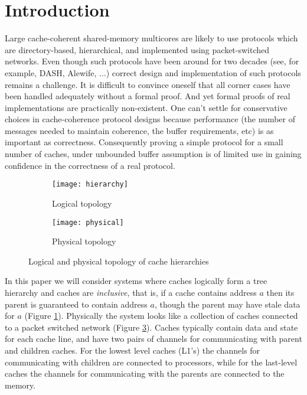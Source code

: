 \section{Introduction} 

Large cache-coherent shared-memory multicores are likely to use protocols which
are directory-based, hierarchical, and implemented using packet-switched networks.  Even
though such protocols have been around for two decades (see, for example,
DASH\cite{DASH}, Alewife\cite{Anant}, ...) correct design and implementation of
such protocols remains a challenge. It is difficult to convince oneself that
all corner cases have been handled adequately without a formal proof. And yet
formal proofs of real implementations are practically non-existent. One can't
settle for conservative choices in cache-coherence protocol designs because
performance (\eg the number of messages needed to maintain coherence, the
buffer requirements, etc) is as important as correctness. Consequently proving
a simple protocol for a small number of caches, under unbounded buffer
assumption is of limited use in gaining confidence in the correctness of a real
protocol. 

\begin{figure}
\centering
\begin{subfigure}{.45\linewidth}
\centering
\texttt{[image: hierarchy]}
\caption{Logical topology}
\label{hierarchy}
\end{subfigure}
\begin{subfigure}{.45\linewidth}
\centering
\texttt{[image: physical]}
\caption{Physical topology}
\label{physical}
\end{subfigure}
\caption{Logical and physical topology of cache hierarchies}
\end{figure}

In this paper we will consider systems where caches logically form a tree
hierarchy and caches are \emph{inclusive}, that is, if a cache contains address
$a$ then its parent is guaranteed to contain address $a$, though the parent may
have stale data for $a$ (Figure \ref{hierarchy}). Physically the system looks
like a collection of caches connected to a packet switched network (Figure
\ref{physical}). Caches typically contain data and state for each cache line,
and have two pairs of channels for communicating with parent and children
caches. For the lowest level caches (L1's) the channels for communicating with
children are connected to processors, while for the last-level caches the
channels for communicating with the parents are connected to the memory. 

